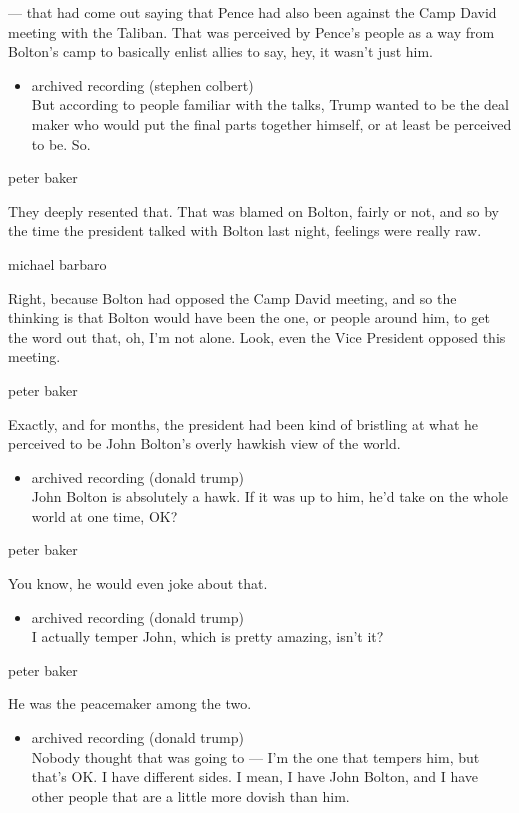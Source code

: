 --- that had come out saying that Pence had also been against the Camp
David meeting with the Taliban. That was perceived by Pence's people as
a way from Bolton's camp to basically enlist allies to say, hey, it
wasn't just him.

\begin{itemize}
\tightlist
\item
  archived recording (stephen colbert)\\
  But according to people familiar with the talks, Trump wanted to be
  the deal maker who would put the final parts together himself, or at
  least be perceived to be. So.
\end{itemize}

peter baker

They deeply resented that. That was blamed on Bolton, fairly or not, and
so by the time the president talked with Bolton last night, feelings
were really raw.

michael barbaro

Right, because Bolton had opposed the Camp David meeting, and so the
thinking is that Bolton would have been the one, or people around him,
to get the word out that, oh, I'm not alone. Look, even the Vice
President opposed this meeting.

peter baker

Exactly, and for months, the president had been kind of bristling at
what he perceived to be John Bolton's overly hawkish view of the world.

\begin{itemize}
\tightlist
\item
  archived recording (donald trump)\\
  John Bolton is absolutely a hawk. If it was up to him, he'd take on
  the whole world at one time, OK?
\end{itemize}

peter baker

You know, he would even joke about that.

\begin{itemize}
\tightlist
\item
  archived recording (donald trump)\\
  I actually temper John, which is pretty amazing, isn't it?
\end{itemize}

peter baker

He was the peacemaker among the two.

\begin{itemize}
\tightlist
\item
  archived recording (donald trump)\\
  Nobody thought that was going to --- I'm the one that tempers him, but
  that's OK. I have different sides. I mean, I have John Bolton, and I
  have other people that are a little more dovish than him.
\end{itemize}

